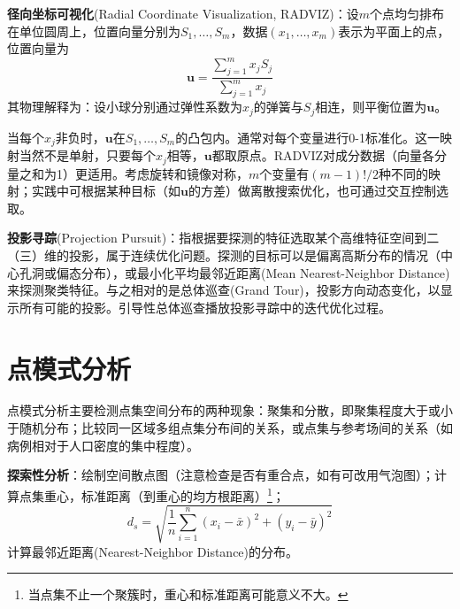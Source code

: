 \par \textbf{径向坐标可视化}(Radial Coordinate Visualization, RADVIZ)：设$m$个点均匀排布在单位圆周上，位置向量分别为$S_1,\dots,S_m$，数据$(x_1,\dots,x_m)$表示为平面上的点，位置向量为
\begin{equation}
    \mathbf{u}=\frac{\sum_{j=1}^m x_j S_j}{\sum_{j=1}^m x_j}
\end{equation}
其物理解释为：设小球分别通过弹性系数为$x_j$的弹簧与$S_j$相连，则平衡位置为$\mathbf{u}$。

\par 当每个$x_j$非负时，$\mathbf{u}$在$S_1,\dots,S_m$的凸包内。通常对每个变量进行0-1标准化。这一映射当然不是单射，只要每个$x_j$相等，$\mathbf{u}$都取原点。RADVIZ对成分数据（向量各分量之和为1）更适用。考虑旋转和镜像对称，$m$个变量有$(m-1)!/2$种不同的映射；实践中可根据某种目标（如$\mathbf{u}$的方差）做离散搜索优化，也可通过交互控制选取。

\par \textbf{投影寻踪}(Projection Pursuit)：指根据要探测的特征选取某个高维特征空间到二（三）维的投影，属于连续优化问题。探测的目标可以是偏离高斯分布的情况（中心孔洞或偏态分布），或最小化平均最邻近距离(Mean Nearest-Neighbor Distance)来探测聚类特征。与之相对的是总体巡查(Grand Tour)，投影方向动态变化，以显示所有可能的投影。引导性总体巡查播放投影寻踪中的迭代优化过程。

\section{点模式分析}
\par 点模式分析主要检测点集空间分布的两种现象：聚集和分散，即聚集程度大于或小于随机分布；比较同一区域多组点集分布间的关系，或点集与参考场间的关系（如病例相对于人口密度的集中程度）。

\par \textbf{探索性分析}：绘制空间散点图（注意检查是否有重合点，如有可改用气泡图）；计算点集重心，标准距离（到重心的均方根距离）\footnote{当点集不止一个聚簇时，重心和标准距离可能意义不大。}；
\begin{equation}
    d_s = \sqrt{\frac{1}{n}\sum_{i=1}^n (x_i-\bar{x})^2+(y_i-\bar{y})^2}
\end{equation}
计算最邻近距离(Nearest-Neighbor Distance)的分布。

